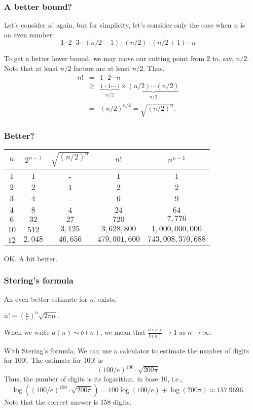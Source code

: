 \begin{frame}\frametitle{A better bound?}
  Let's consider $n!$ again, but for simplicity, let's consider only
  the case when $n$ is an even number:
  \[ 1\cdot 2\cdot 3\cdots (n/2-1)\cdot(n/2)\cdot (n/2+1)\cdots n \]
  \pause

  To get a better lower bound, we may move our cutting point from $2$
  to, say, $n/2$.  Note that at least $n/2$ factors are at least
  $n/2$.  Thus,
  \begin{eqnarray*}
    n! &=& 1\cdot 2\cdots n \\
    &\geq& \underbrace{1\cdot 1\cdots 1}_{n/2}\times\underbrace{(n/2)\cdots(n/2)}_{n/2} \\
    &=& (n/2)^{n/2} = \sqrt{(n/2)^n}.
  \end{eqnarray*}
\end{frame}

\begin{frame}\frametitle{Better?}
  \begin{tabular}{c|c|c|c|c}
    $n$ & $2^{n-1}$ & $\sqrt{(n/2)^n}$ & $n!$ & $n^{n-1}$ \\ \hline
    $1$ & $1$ & - & $1$ & $1$ \\
    $2$ & $2$ & $1$ & $2$ & $2$ \\
    $3$ & $4$ & - & $6$ & $9$ \\
    $4$ & $8$ & $4$ & $24$ & $64$ \\
    $6$ & $32$ & $27$ & $720$ & $7,776$ \\
    $10$ & $512$ & $3,125$ & $3,628,800$ & $1,000,000,000$ \\
    $12$ & $2,048$ & $46,656$ & $479,001,600$ & $743,008,370,688$
  \end{tabular}

  \vspace{0.2in}

  OK. A bit better.
\end{frame}

\begin{frame}\frametitle{Stering's formula}
  An even better estimate for $n!$ exists.

  \begin{theorem}
    $n!\sim \left(\frac{n}{e}\right)^n\sqrt{2\pi n}$.
  \end{theorem}

  \vspace{0.2in}
  When we write $a(n)\sim b(n)$, we mean that
  $\frac{a(n)}{b(n)}\rightarrow 1$ as $n\rightarrow\infty$.
  \pause

  With Stering's formula, We can use a calculator to estimate the
  number of digits for $100!$.  \pause The estimate for $100!$ is
  \[ (100/e)^{100}\cdot\sqrt{200\pi}\]
  Thus, the number of digits is its logarithm, in base 10, i.e.,
  \[\log\left((100/e)^{100}\cdot\sqrt{200\pi}\right) = 100\log(100/e) + \log(200\pi) \approx 157.9696.\]
  \pause
  Note that the correct answer is 158 digits.
\end{frame}

